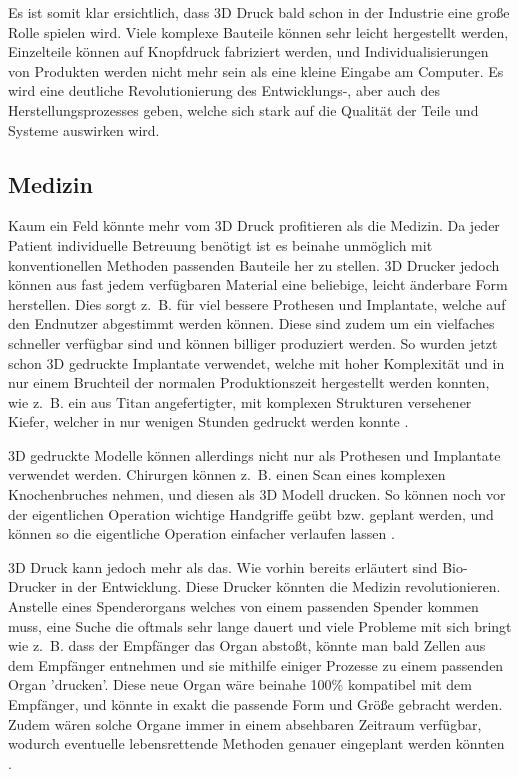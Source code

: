 Es ist somit klar ersichtlich, dass 3D Druck bald schon in der Industrie eine große Rolle spielen wird. Viele komplexe Bauteile können sehr leicht hergestellt werden, Einzelteile können auf Knopfdruck fabriziert werden, und Individualisierungen von Produkten werden nicht mehr sein als eine kleine Eingabe am Computer. Es wird eine deutliche Revolutionierung des Entwicklungs-, aber auch des Herstellungsprozesses geben, welche sich stark auf die Qualität der Teile und Systeme auswirken wird.

\subsection{Medizin}

Kaum ein Feld könnte mehr vom 3D Druck profitieren als die Medizin. Da jeder Patient individuelle Betreuung benötigt ist es beinahe unmöglich mit konventionellen Methoden passenden Bauteile her zu stellen. 3D Drucker jedoch können aus fast jedem verfügbaren Material eine beliebige, leicht änderbare Form herstellen. Dies sorgt z.~B. für viel bessere Prothesen und Implantate, welche auf den Endnutzer abgestimmt werden können. Diese sind zudem um ein vielfaches schneller verfügbar sind und können billiger produziert werden. So wurden jetzt schon 3D gedruckte Implantate verwendet, welche mit hoher Komplexität und in nur einem Bruchteil der normalen Produktionszeit hergestellt werden konnten, wie z.~B. ein aus Titan angefertigter, mit komplexen Strukturen versehener Kiefer, welcher in nur wenigen Stunden gedruckt werden konnte \parencite{IRONJAW}.

3D gedruckte Modelle können allerdings nicht nur als Prothesen und Implantate verwendet werden. Chirurgen können z.~B. einen Scan eines komplexen Knochenbruches nehmen, und diesen als 3D Modell drucken. So können noch vor der eigentlichen Operation wichtige Handgriffe geübt bzw. geplant werden, und können so die eigentliche Operation einfacher verlaufen lassen \parencite{ORTHOPEDICS}.

3D Druck kann jedoch mehr als das. Wie vorhin bereits erläutert sind Bio-Drucker in der Entwicklung. Diese Drucker könnten die Medizin revolutionieren. Anstelle eines Spenderorgans welches von einem passenden Spender kommen muss, eine Suche die oftmals sehr lange dauert und viele Probleme mit sich bringt wie z.~B. dass der Empfänger das Organ abstoßt, könnte man bald Zellen aus dem Empfänger entnehmen und sie mithilfe einiger Prozesse zu einem passenden Organ 'drucken'. Diese neue Organ wäre beinahe 100\% kompatibel mit dem Empfänger, und könnte in exakt die passende Form und Größe gebracht werden. Zudem wären solche Organe immer in einem absehbaren Zeitraum verfügbar, wodurch eventuelle lebensrettende Methoden genauer eingeplant werden könnten \parencite{ORGANOVO}.

